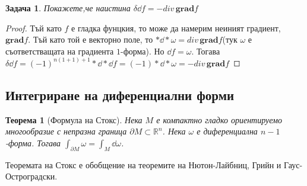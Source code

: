 \documentclass[12pt]{article}
\newtheorem{problem}{Задача}
\newtheorem*{theorem*}{Теорема}
\begin{document}
\begin{large}
\begin{problem}
Покажете,че наистина $\delta \dd f = - div \, \mathbf{grad} f$
\end{problem}

\begin{proof}
Тъй като $f$ е гладка фунцкия, то може да намерим неиният градиент, $\mathbf{grad} f$. Тъй като той е векторно поле, то $\ast \dd \ast \omega = div \, \mathbf{grad} f$(тук $\omega$ е съответстващата на градиента $1$-форма). Но $\dd f = \omega$. Тогава $\delta \dd f = (-1)^{n(1+1)+1} \ast \dd \ast \dd f = (-1) \ast \dd \ast \omega = - div \, \mathbf{grad} f$
\end{proof}

\subsection{Интегриране на диференциални форми}

\begin{theorem*}[Формула на Стокс]
Нека $M$ е компактно гладко ориентируемо многообразие с непразна граница $\partial M \subset \mathbb{R}^n$. Нека $\omega$ е диференциална $n-1$-форма. Тогава $\int_{\partial M} \omega = \int_M \dd \omega$.
\end{theorem*}

Теоремата на Стокс е обобщение на теоремите на Нютон-Лайбниц, Грийн и Гаус-Остроградски.

\end{large}
\end{document}
